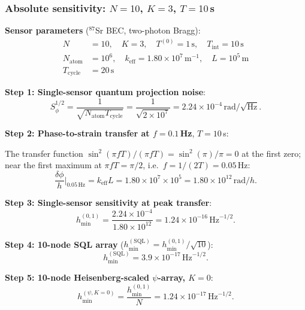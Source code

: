 \documentclass[11pt]{article}
\theoremstyle{definition}
\theoremstyle{remark}
\newcommand{\SQL}{\mathrm{SQL}}
\begin{document}
\subsubsection{Absolute sensitivity: $N=10$, $K=3$, $T=10$\,s}

\textbf{Sensor parameters} ($^{87}$Sr BEC, two-photon Bragg):
\begin{align*}
N &= 10,\quad K = 3,\quad T^{(0)} = 1\,\mathrm{s},
\quad T_{\mathrm{int}} = 10\,\mathrm{s} \\
N_{\mathrm{atom}} &= 10^6,\quad k_{\mathrm{eff}} = 1.80\times10^7\,\mathrm{m}^{-1},
\quad L = 10^5\,\mathrm{m}\\
T_{\mathrm{cycle}} &= 20\,\mathrm{s}
\end{align*}

\textbf{Step 1: Single-sensor quantum projection noise}:
\begin{equation}
S_\phi^{1/2} = \frac{1}{\sqrt{N_{\mathrm{atom}} T_{\mathrm{cycle}}}}
= \frac{1}{\sqrt{2\times10^7}} = 2.24\times10^{-4}\,\mathrm{rad}/\sqrt{\mathrm{Hz}}.
\end{equation}

\textbf{Step 2: Phase-to-strain transfer at $f = 0.1$\,Hz}, $T = 10$\,s:

The transfer function $\sin^2(\pi f T)/(\pi f T) = \sin^2(\pi)/\pi
= 0$ at the first zero; near the first maximum at $\pi f T = \pi/2$,
i.e.\ $f = 1/(2T) = 0.05$\,Hz:
\begin{equation}
\frac{\delta\phi}{h}\bigg|_{0.05\,\mathrm{Hz}}
= k_{\mathrm{eff}} L = 1.80\times10^7 \times 10^5
= 1.80\times10^{12}\,\mathrm{rad}/h.
\end{equation}

\textbf{Step 3: Single-sensor sensitivity at peak transfer}:
\begin{equation}
h_{\min}^{(0,1)} = \frac{2.24\times10^{-4}}{1.80\times10^{12}}
= 1.24\times10^{-16}\,\mathrm{Hz}^{-1/2}.
\end{equation}

\textbf{Step 4: 10-node SQL array} ($h_{\min}^{(\SQL)} = h_{\min}^{(0,1)}/\sqrt{10}$):
\begin{equation}
h_{\min}^{(\SQL)} = 3.9\times10^{-17}\,\mathrm{Hz}^{-1/2}.
\end{equation}

\textbf{Step 5: 10-node Heisenberg-scaled $\psi$-array, $K=0$}:
\begin{equation}
h_{\min}^{(\psi,K=0)} = \frac{h_{\min}^{(0,1)}}{N}
= 1.24\times10^{-17}\,\mathrm{Hz}^{-1/2}.
\end{equation}
\end{document}
